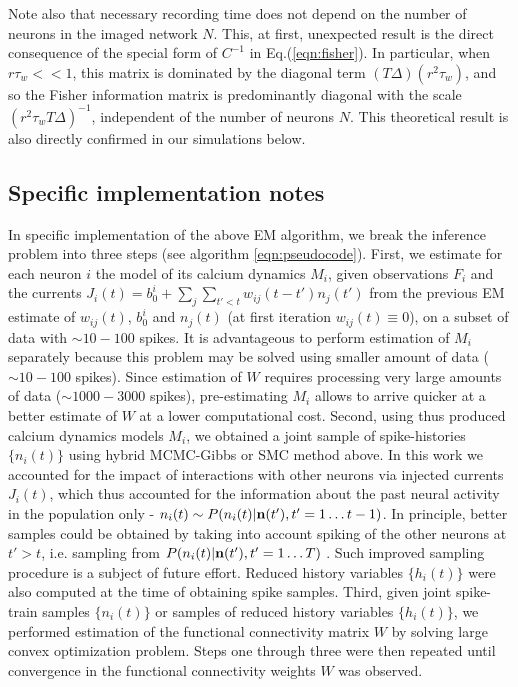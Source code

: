 \documentclass[amsmath,amssymb]{revtex4}
\begin{document}
Note also that necessary recording time does not depend on the number of neurons in the imaged network $N$. This, at first, unexpected result is the direct consequence of the special form of $C^{-1}$ in Eq.(\ref{eqn:fisher}). In particular, when $r \tau_w <<1$, this matrix is dominated by the diagonal term $(T\Delta)(r^2  \tau_w)$, and so the Fisher information matrix is predominantly diagonal with the scale $(r^2 \tau_w T\Delta)^{-1}$, independent of the number of neurons $N$. This theoretical result is also directly confirmed in our simulations below.


\subsection{\label{sec:methods:specific_implementation}Specific implementation notes}
In specific implementation of the above EM algorithm, we break the inference problem into three steps (see algorithm \ref{eqn:pseudocode}).
First, we estimate for each neuron $i$ the model of its calcium dynamics $M_i$, given observations $F_i$ and the currents $J_i(t)=b^i_0+\sum_{j}\sum_{t'<t}w_{ij}(t-t')n_{j}(t')$ from the previous EM estimate of $w_{ij}(t)$, $b^i_0$ and $n_{j}(t)$ (at first iteration $w_{ij}(t) \equiv 0$),
on a subset of data with $\sim 10-100$ spikes.
It is advantageous to perform estimation of $M_i$ separately because this problem may be solved using smaller amount of data ($\sim 10-100$ spikes). Since estimation of $W$ requires processing very large amounts of data ($\sim 1000-3000$ spikes), pre-estimating $M_i$ allows to arrive quicker at a better estimate of $W$ at a lower computational cost.
Second, using thus produced calcium dynamics models $M_i$, we obtained a joint sample of spike-histories $\{ n_i(t)\}$ using hybrid MCMC-Gibbs or SMC method above.
In this work we accounted for the impact of interactions with other neurons via injected currents $J_i(t)$, which thus accounted for the information about the past neural activity in the population only - $n_i(t) \sim P(n_i(t)|{\bf n}(t'),{t'=1\ldots t-1})$. In principle, better samples could be obtained by taking into account spiking of the other neurons at $t'>t$, i.e. sampling from $P(n_i(t)|{\bf n}(t'),{t'=1\ldots T})$ \cite{PL07}. Such improved sampling procedure is a subject of future effort.
Reduced history variables $\{h_i(t)\}$ were also computed at the time of obtaining spike samples.
Third, given joint spike-train samples $\{ n_i(t)\}$ or samples of reduced history variables $\{ h_i(t)\}$, we performed estimation of the functional connectivity matrix $W$ by solving large convex optimization problem.
Steps one through three were then repeated until convergence in the functional connectivity weights $W$ was observed.
\end{document}
